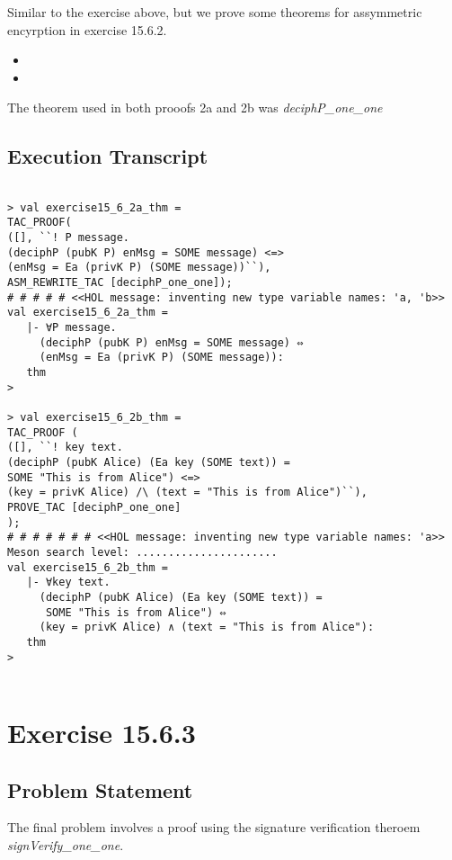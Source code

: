 \documentclass[11pt, twoside]{article}
\begin{document}
Similar to the exercise above, but we prove some theorems for assymmetric encyrption
in exercise 15.6.2. 
\begin{itemize}
  \item {}
  \item {}
\end{itemize}
The theorem used in both prooofs 2a and 2b 
was \textit{deciphP_one_one}

\subsection{Execution Transcript}
\label{sec:execution-transcript-2}

\lstset{frameround=fftt}
\begin{lstlisting}

> val exercise15_6_2a_thm = 
TAC_PROOF(
([], ``! P message.
(deciphP (pubK P) enMsg = SOME message) <=>
(enMsg = Ea (privK P) (SOME message))``),
ASM_REWRITE_TAC [deciphP_one_one]);
# # # # # <<HOL message: inventing new type variable names: 'a, 'b>>
val exercise15_6_2a_thm =
   |- ∀P message.
     (deciphP (pubK P) enMsg = SOME message) ⇔
     (enMsg = Ea (privK P) (SOME message)):
   thm
> 

> val exercise15_6_2b_thm =
TAC_PROOF (
([], ``! key text.
(deciphP (pubK Alice) (Ea key (SOME text)) =
SOME "This is from Alice") <=>
(key = privK Alice) /\ (text = "This is from Alice")``),
PROVE_TAC [deciphP_one_one]
);
# # # # # # # <<HOL message: inventing new type variable names: 'a>>
Meson search level: ......................
val exercise15_6_2b_thm =
   |- ∀key text.
     (deciphP (pubK Alice) (Ea key (SOME text)) =
      SOME "This is from Alice") ⇔
     (key = privK Alice) ∧ (text = "This is from Alice"):
   thm
> 


\end{lstlisting}
\section{Exercise 15.6.3}
\label{sec:exercise-15.6.3}

\subsection{Problem Statement}
\label{sec:problem-statement-3}

The final problem involves a proof using the signature verification theroem 
\textit{signVerify_one_one}.
\end{document}
